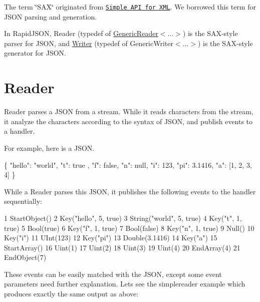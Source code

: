 The term \char`\"{}\+S\+A\+X\char`\"{} originated from \href{http://en.wikipedia.org/wiki/Simple_API_for_XML}{\tt Simple A\+PI for X\+ML}. We borrowed this term for J\+S\+ON parsing and generation.

In Rapid\+J\+S\+ON, {\ttfamily Reader} (typedef of {\ttfamily \hyperlink{class_generic_reader}{Generic\+Reader}$<$...$>$}) is the S\+A\+X-\/style parser for J\+S\+ON, and {\ttfamily \hyperlink{class_writer}{Writer}} (typedef of {\ttfamily Generic\+Writer$<$...$>$}) is the S\+A\+X-\/style generator for J\+S\+ON.\hypertarget{md_Cadriciel_Commun_Externe_RapidJSON_doc_sax.zh-cn_Reader}{}\section{Reader}\label{md_Cadriciel_Commun_Externe_RapidJSON_doc_sax.zh-cn_Reader}
{\ttfamily Reader} parses a J\+S\+ON from a stream. While it reads characters from the stream, it analyze the characters according to the syntax of J\+S\+ON, and publish events to a handler.

For example, here is a J\+S\+ON.


\begin{DoxyCode}
\{
    \textcolor{stringliteral}{"hello"}: \textcolor{stringliteral}{"world"},
    \textcolor{stringliteral}{"t"}: true ,
    \textcolor{stringliteral}{"f"}: \textcolor{keyword}{false},
    \textcolor{stringliteral}{"n"}: null,
    \textcolor{stringliteral}{"i"}: 123,
    \textcolor{stringliteral}{"pi"}: 3.1416,
    \textcolor{stringliteral}{"a"}: [1, 2, 3, 4]
\}
\end{DoxyCode}


While a {\ttfamily Reader} parses this J\+S\+ON, it publishes the following events to the handler sequentially\+:


\begin{DoxyCode}
1 StartObject()
2 Key("hello", 5, true)
3 String("world", 5, true)
4 Key("t", 1, true)
5 Bool(true)
6 Key("f", 1, true)
7 Bool(false)
8 Key("n", 1, true)
9 Null()
10 Key("i")
11 UInt(123)
12 Key("pi")
13 Double(3.1416)
14 Key("a")
15 StartArray()
16 Uint(1)
17 Uint(2)
18 Uint(3)
19 Uint(4)
20 EndArray(4)
21 EndObject(7)
\end{DoxyCode}


These events can be easily matched with the J\+S\+ON, except some event parameters need further explanation. Let\textquotesingle{}s see the {\ttfamily simplereader} example which produces exactly the same output as above\+:


